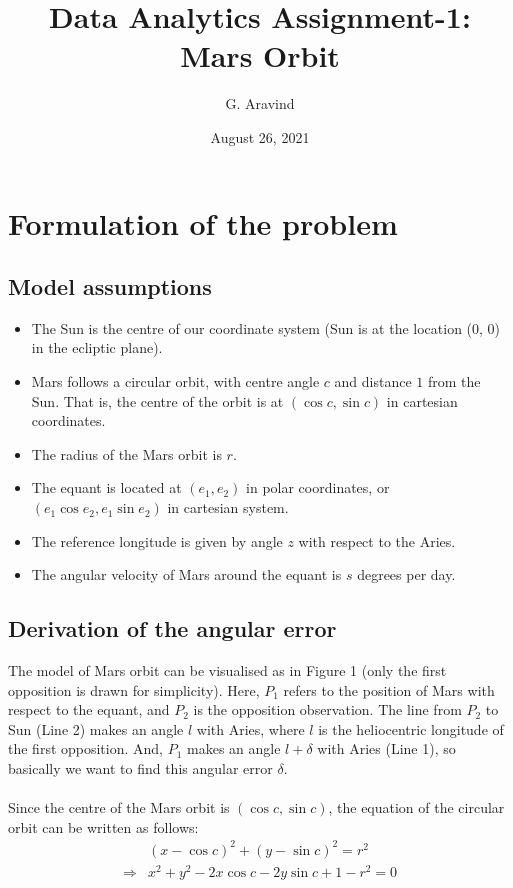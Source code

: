 \documentclass[11pt]{article}
\title{Data Analytics Assignment-1: Mars Orbit}
\author{G. Aravind}
\date{August 26, 2021}
\begin{document}
\maketitle

\section{Formulation of the problem}\label{section-formulation}

\subsection{Model assumptions}
\begin{itemize}
    \item The Sun is the centre of our coordinate system (Sun is at the location (0, 0) in the ecliptic plane).
    \item Mars follows a circular orbit, with centre angle $c$ and distance $1$ from the Sun. That is, the centre of the orbit is at $(\cos{c}, \sin{c})$ in cartesian coordinates.
    \item The radius of the Mars orbit is $r$.
    \item The equant is located at $(e_1, e_2)$ in polar coordinates, or $(e_1 \cos{e_2}, e_1 \sin{e_2})$ in cartesian system.
    \item The reference longitude is given by angle $z$ with respect to the Aries.
    \item The angular velocity of Mars around the equant is $s$ degrees per day.
\end{itemize}

\subsection{Derivation of the angular error}

The model of Mars orbit can be visualised as in Figure 1 (only the first opposition is drawn for simplicity).  Here, $P_1$ refers to the position of Mars with respect to the equant, and $P_2$ is the opposition observation. The line from $P_2$ to Sun (Line 2) makes an angle $l$ with Aries, where $l$ is the heliocentric longitude of the first opposition. And, $P_1$ makes an angle $l + \delta$ with Aries (Line 1), so basically we want to find this angular error $\delta$.
\\
\\
Since the centre of the Mars orbit is $(\cos{c}, \sin{c})$, the equation of the circular orbit can be written as follows:
\begin{align*}
 &(x - \cos{c})^2 + (y - \sin{c})^2 = r^2\\
\Rightarrow & x^2 + y^2 - 2x\cos{c} -2y\sin{c} + 1 - r^2= 0
\end{align*}
\end{document}
